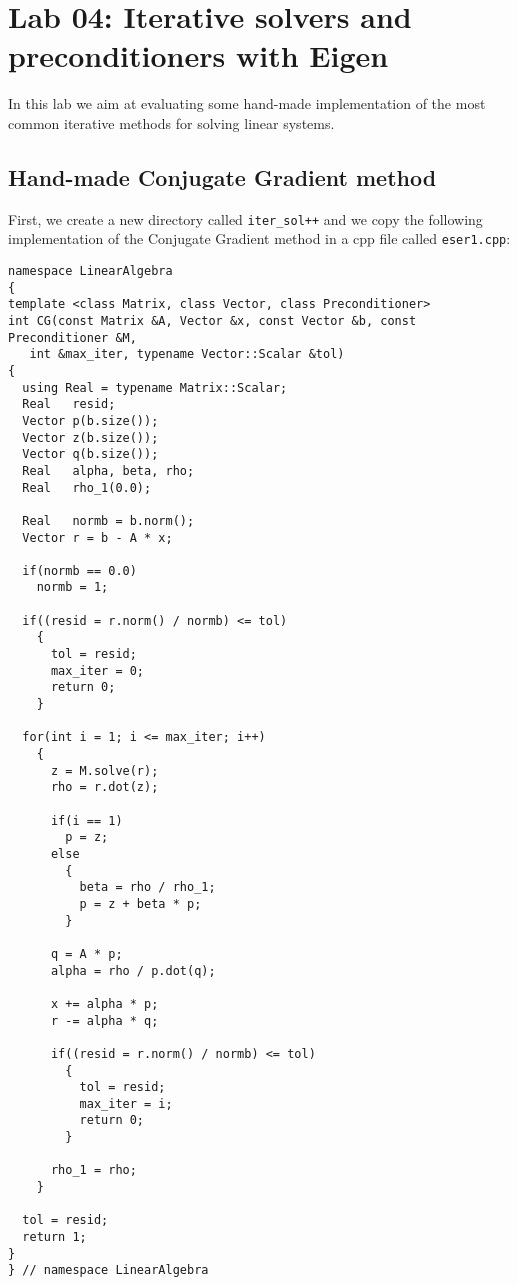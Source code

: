 
\chapter{Lab 04: Iterative solvers and preconditioners with Eigen}
\thispagestyle{empty}

In this lab we aim at evaluating some hand-made implementation of the most common iterative methods for solving linear systems.

\section{Hand-made Conjugate Gradient method}

First, we create a new directory called \texttt{iter\_sol++} and we copy the following implementation of the Conjugate Gradient method in a cpp file called \texttt{eser1.cpp}:

\begin{lstlisting}
namespace LinearAlgebra
{
template <class Matrix, class Vector, class Preconditioner>
int CG(const Matrix &A, Vector &x, const Vector &b, const Preconditioner &M,
   int &max_iter, typename Vector::Scalar &tol)
{
  using Real = typename Matrix::Scalar;
  Real   resid;
  Vector p(b.size());
  Vector z(b.size());
  Vector q(b.size());
  Real   alpha, beta, rho;
  Real   rho_1(0.0);

  Real   normb = b.norm();
  Vector r = b - A * x;

  if(normb == 0.0)
    normb = 1;

  if((resid = r.norm() / normb) <= tol)
    {
      tol = resid;
      max_iter = 0;
      return 0;
    }

  for(int i = 1; i <= max_iter; i++)
    {
      z = M.solve(r);
      rho = r.dot(z);

      if(i == 1)
        p = z;
      else
        {
          beta = rho / rho_1;
          p = z + beta * p;
        }

      q = A * p;
      alpha = rho / p.dot(q);

      x += alpha * p;
      r -= alpha * q;

      if((resid = r.norm() / normb) <= tol)
        {
          tol = resid;
          max_iter = i;
          return 0;
        }

      rho_1 = rho;
    }

  tol = resid;
  return 1;
}
} // namespace LinearAlgebra   
\end{lstlisting}

